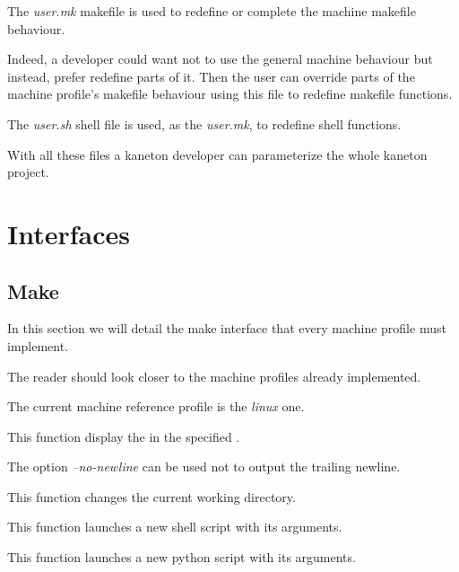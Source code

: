 The \textit{user.mk} makefile is used to redefine or complete the machine
makefile behaviour.

Indeed, a developer could want not to use the general machine behaviour but
instead, prefer redefine parts of it. Then the user can override parts of
the machine profile's makefile behaviour using this file to redefine makefile
functions.

The \textit{user.sh} shell file is used, as the \textit{user.mk}, to
redefine shell functions.

With all these files a kaneton developer can parameterize the whole
kaneton project.

%
%

\section{Interfaces}

%
%

\subsection{Make}

In this section we will detail the make interface that every machine
profile must implement.

The reader should look closer to the machine profiles already implemented.

The current machine reference profile is the \textit{linux} one.

         {
	   This function display the  in the specified
	   .

	   The option \textit{--no-newline} can be used not to output
	   the trailing newline.
	 }

         {
	   This function changes the current working directory.
	 }

         {
	   This function launches a new shell script with its arguments.
	 }

         {
	   This function launches a new python script with its arguments.
	 }

